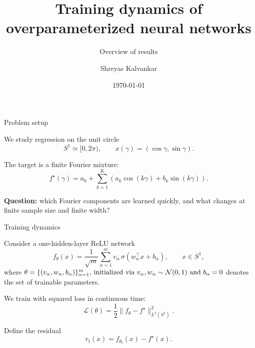 \documentclass[10pt,aspectratio=169]{beamer}
\title{Training dynamics of overparameterized neural networks}
\subtitle{Overview of results}
\author{Shreyas Kalvankar}
\institute{TU Delft}
\date{\today}
\begin{document}
\maketitle

\begin{frame}{Problem setup}

	We study regression on the unit circle
	\[
		S^1 \simeq [0,2\pi),
		\qquad
		x(\gamma)=(\cos\gamma,\sin\gamma).
	\]

	The target is a finite Fourier mixture:
	\[
		f^\star(\gamma)
		=
		a_0
		+
		\sum_{k=1}^{K}
		\left(
		a_k\cos(k\gamma)
		+
		b_k\sin(k\gamma)
		\right).
	\]

	\medskip

	\textbf{Question:}
	which Fourier components are learned quickly, and what changes at finite sample size and finite width?


\end{frame}

\begin{frame}{Training dynamics}

	Consider a one-hidden-layer ReLU network
	\[
		f_\theta(x) = \frac{1}{\sqrt m} \sum_{\alpha=1}^{m} v_\alpha\,\sigma(w_\alpha^\top x+b_\alpha), \qquad x\in S^1,
	\]
	where \(\theta = \{(v_\alpha, w_\alpha, b_\alpha)\}_{\alpha=1}^m$,
		initialized via $v_\alpha, w_\alpha \sim \mathcal{N}(0, 1)$ and $b_\alpha =
	0\) denotes the set of trainable parameters.

	\pause
	We train with squared loss in continuous time:
	\[
		\mathcal L(\theta)
		=
		\frac12
		\|f_\theta-f^\star\|_{L^2(S^1)}^2 .
	\]

	\pause

	Define the residual
	\[
		r_t(x)=f_{\theta_t}(x)-f^\star(x).
	\]

\end{frame}
\end{document}
